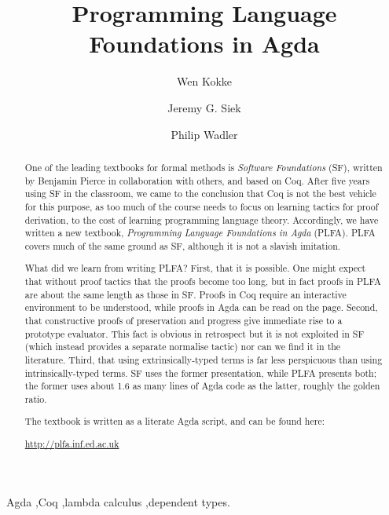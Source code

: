 \documentclass[preprint,authoryear]{elsarticle}
\begin{document}
\title{Programming Language Foundations in Agda}

\author[adr1]{Wen Kokke}
\author[adr2]{Jeremy G. Siek}
\author[adr1]{Philip Wadler}

\address[adr1]{University of Edinburgh, 10 Crichton Street, EH8 9AB, Edinburgh}
\address[adr2]{Indiana University, 700 N Woodlawn Ave, Bloomington, IN 47408, USA}

\begin{abstract}

  One of the leading textbooks for formal methods is \emph{Software
    Foundations} (SF), written by Benjamin Pierce in collaboration
  with others, and based on Coq. After five years using SF in the
  classroom, we came to the conclusion that Coq is not the best
  vehicle for this purpose, as too much of the course needs to focus
  on learning tactics for proof derivation, to the cost of learning
  programming language theory.  Accordingly, we have written a new
  textbook, \emph{Programming Language Foundations in Agda}
  (PLFA). PLFA covers much of the same ground as SF, although it is
  not a slavish imitation.

  What did we learn from writing PLFA? First, that it is possible. One
  might expect that without proof tactics that the proofs become too
  long, but in fact proofs in PLFA are about the same length as those
  in SF. Proofs in Coq require an interactive environment to be
  understood, while proofs in Agda can be read on the page.  Second,
  that constructive proofs of preservation and progress give immediate
  rise to a prototype evaluator. This fact is obvious in retrospect
  but it is not exploited in SF (which instead provides a separate
  normalise tactic) nor can we find it in the literature.  Third, that
  using extrinsically-typed terms is far less
  perspicuous than using intrinsically-typed terms. SF uses the former
  presentation, while PLFA presents both; the former uses about 1.6 as
  many lines of Agda code as the latter, roughly the golden ratio.

  The textbook is written as a literate Agda script, and can be found
  here:
  \begin{center}
    \url{http://plfa.inf.ed.ac.uk}
  \end{center}
\end{abstract}

\begin{keyword}
  Agda \sep Coq \sep lambda calculus \sep dependent types.  
\end{keyword}
\end{document}
